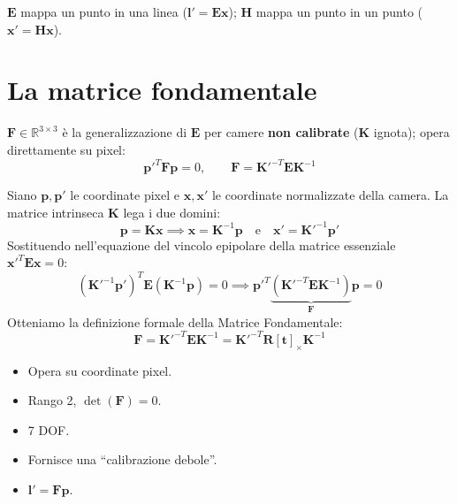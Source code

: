 \documentclass[12pt, a4paper]{report}
\newcommand{\R}{\mathbb{R}}
\begin{document}
\begin{notebox}[E vs.\ H]
$\mathbf{E}$ mappa un punto in una linea ($\mathbf{l}'=\mathbf{Ex}$);
$\mathbf{H}$ mappa un punto in un punto ($\mathbf{x}'=\mathbf{Hx}$).
\end{notebox}

\section{La matrice fondamentale}

\begin{defbox}
$\mathbf{F}\in\R^{3\times3}$ è la generalizzazione di $\mathbf{E}$ per camere
\textbf{non calibrate} ($\mathbf{K}$ ignota); opera direttamente su pixel:
\[
  \mathbf{p}'^T\mathbf{F}\mathbf{p}=0, \qquad
  \mathbf{F}=\mathbf{K}'^{-T}\mathbf{E}\mathbf{K}^{-1}
\]
\end{defbox}

\begin{propbox}
Siano $\mathbf{p}, \mathbf{p}'$ le coordinate pixel e $\mathbf{x}, \mathbf{x}'$ le coordinate normalizzate della camera. La matrice intrinseca $\mathbf{K}$ lega i due domini:
\[
  \mathbf{p} = \mathbf{K} \mathbf{x} \implies \mathbf{x} = \mathbf{K}^{-1} \mathbf{p} \quad \text{e} \quad \mathbf{x}' = \mathbf{K}'^{-1} \mathbf{p}'
\]
Sostituendo nell'equazione del vincolo epipolare della matrice essenziale $\mathbf{x}'^T \mathbf{E} \mathbf{x} = 0$:
\[
  (\mathbf{K}'^{-1} \mathbf{p}')^T \mathbf{E} (\mathbf{K}^{-1} \mathbf{p}) = 0 \implies \mathbf{p}'^T \underbrace{(\mathbf{K}'^{-T} \mathbf{E} \mathbf{K}^{-1})}_{\mathbf{F}} \mathbf{p} = 0
\]
Otteniamo la definizione formale della Matrice Fondamentale:
\[
  \mathbf{F} = \mathbf{K}'^{-T} \mathbf{E} \mathbf{K}^{-1} = \mathbf{K}'^{-T} \mathbf{R} [\mathbf{t}]_\times \mathbf{K}^{-1}
\]
\end{propbox}

\begin{propbox}
\begin{itemize}
  \item Opera su coordinate pixel.
  \item Rango 2, $\det(\mathbf{F})=0$.
  \item 7 DOF.
  \item Fornisce una ``calibrazione debole''.
  \item $\mathbf{l}'=\mathbf{Fp}$.
\end{itemize}
\end{propbox}
\end{document}

